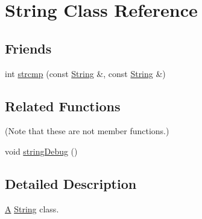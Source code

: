 \hypertarget{classString}{\section{String Class Reference}
\label{classString}
}
\subsection*{Friends}
\begin{DoxyCompactItemize}
\item 
int \hyperlink{classString_ae3c243f0bc797b9e4b15d2ef5e5aaa7c}{strcmp} (const \hyperlink{classString}{String} \&, const \hyperlink{classString}{String} \&)
\end{DoxyCompactItemize}
\subsection*{Related Functions}
(Note that these are not member functions.) \begin{DoxyCompactItemize}
\item 
void \hyperlink{classString_a5c07384b505d25ae6f61fc7abf0b0e61}{string\-Debug} ()
\end{DoxyCompactItemize}


\subsection{Detailed Description}
\hyperlink{classA}{A} \hyperlink{classString}{String} class. 

